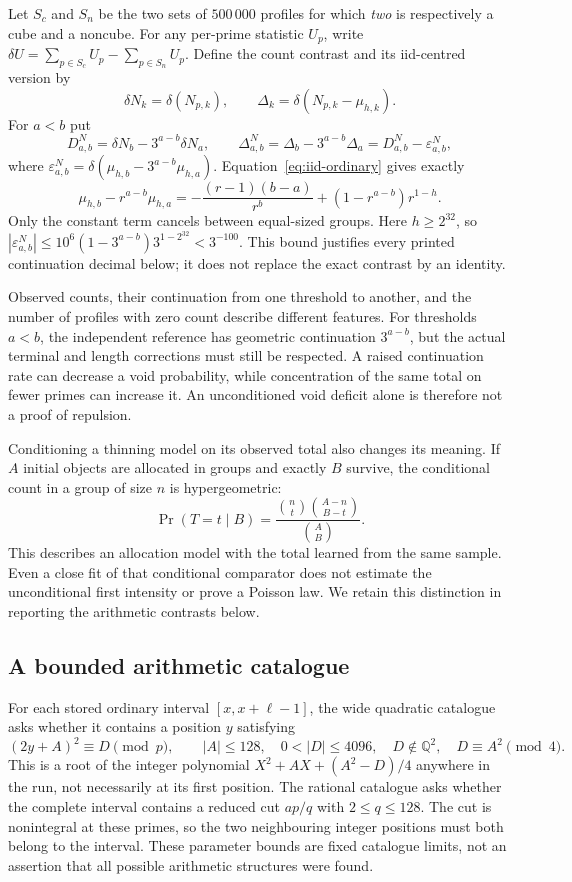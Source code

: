\documentclass[11pt]{article}
\theoremstyle{definition}\newtheorem{definition}[theorem]{Definition}
\newcommand{\Q}{\mathbb Q}
\newcommand{\Prob}{\operatorname{Pr}}
\begin{document}
Let $S_c$ and $S_n$ be the two sets of $500\,000$ profiles for which
\emph{two} is respectively a cube and a noncube. For any per-prime
statistic $U_p$, write $\delta U=\sum_{p\in S_c}U_p-\sum_{p\in S_n}U_p$.
Define the count contrast and its iid-centred version by
\begin{equation}\label{eq:ternary-contrasts}
 \delta N_k=\delta(N_{p,k}),\qquad
 \Delta_k=\delta(N_{p,k}-\mu_{h,k}).
\end{equation}
For $a<b$ put
\[
 D^N_{a,b}=\delta N_b-3^{a-b}\delta N_a,\qquad
 \Delta^N_{a,b}=\Delta_b-3^{a-b}\Delta_a
                 =D^N_{a,b}-\varepsilon^N_{a,b},
\]
where $\varepsilon^N_{a,b}=\delta(\mu_{h,b}-3^{a-b}\mu_{h,a})$.
Equation~\eqref{eq:iid-ordinary} gives exactly
\[
 \mu_{h,b}-r^{a-b}\mu_{h,a}
 =-\frac{(r-1)(b-a)}{r^b}+(1-r^{a-b})r^{1-h}.
\]
Only the constant term cancels between equal-sized groups. Here
$h\ge2^{32}$, so
$|\varepsilon^N_{a,b}|\le10^6(1-3^{a-b})3^{1-2^{32}}<3^{-100}$.
This bound justifies every printed continuation decimal below;
it does not replace the exact contrast by an identity.

Observed counts, their continuation from one threshold
to another, and the number of profiles with zero count
describe different features. For thresholds $a<b$,
the independent reference has geometric continuation
$3^{a-b}$, but the actual terminal and length corrections
must still be respected. A raised continuation rate can
decrease a void probability, while concentration of the
same total on fewer primes can increase it.
An unconditioned void deficit alone is therefore not a
proof of repulsion.

Conditioning a thinning model on its observed total
also changes its meaning. If $A$ initial objects are
allocated in groups and exactly $B$ survive, the
conditional count in a group of size $n$ is
hypergeometric:
\[
 \Prob(T=t\mid B)=
 \frac{\binom nt\binom{A-n}{B-t}}{\binom AB}.
\]
This describes an allocation model with the total
learned from the same sample. Even a close fit of that
conditional comparator does not estimate the
unconditional first intensity or prove a Poisson
law. We retain this distinction in reporting
the arithmetic contrasts below.

\subsection{A bounded arithmetic catalogue}
For each stored ordinary interval $[x,x+\ell-1]$,
the wide quadratic catalogue asks whether it contains
a position $y$ satisfying
\[
 (2y+A)^2\equiv D\pmod p,\qquad
 |A|\le128,\quad0<|D|\le4096,\quad
 D\notin\Q^2,\quad D\equiv A^2\pmod4.
\]
This is a root of the integer polynomial
$X^2+AX+(A^2-D)/4$ anywhere in the run,
not necessarily at its first position.
The rational catalogue asks whether the complete
interval contains a reduced cut $ap/q$ with
$2\le q\le128$.
The cut is nonintegral at these primes, so the
two neighbouring integer positions must both
belong to the interval. These parameter bounds
are fixed catalogue limits, not an assertion that
all possible arithmetic structures were found.
\end{document}
